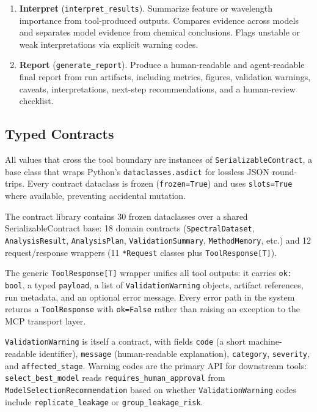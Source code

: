 \begin{enumerate}
  \item \textbf{Interpret} (\texttt{interpret\_results}).
    Summarize feature or wavelength importance from tool-produced outputs.
    Compares evidence across models and separates model evidence from chemical
    conclusions.
    Flags unstable or weak interpretations via explicit warning codes.

  \item \textbf{Report} (\texttt{generate\_report}).
    Produce a human-readable and agent-readable final report from run
    artifacts, including metrics, figures, validation warnings, caveats,
    interpretations, next-step recommendations, and a human-review checklist.
\end{enumerate}

\subsection{Typed Contracts}
\label{sec:contracts}

All values that cross the tool boundary are instances of
\texttt{SerializableContract}, a base class that wraps Python's
\texttt{dataclasses.asdict} for lossless JSON round-trips.
Every contract dataclass is frozen (\texttt{frozen=True}) and uses
\texttt{slots=True} where available, preventing accidental mutation.

The contract library contains 30 frozen dataclasses over a shared
SerializableContract base: 18 domain contracts
(\texttt{SpectralDataset}, \texttt{AnalysisResult}, \texttt{AnalysisPlan},
\texttt{ValidationSummary}, \texttt{MethodMemory}, etc.) and 12
request/response wrappers (11 \texttt{*Request} classes plus
\texttt{ToolResponse[T]}).

The generic \texttt{ToolResponse[T]} wrapper unifies all tool outputs:
it carries \texttt{ok: bool}, a typed \texttt{payload}, a list of
\texttt{ValidationWarning} objects, artifact references, run metadata, and an
optional error message.
Every error path in the system returns a \texttt{ToolResponse} with
\texttt{ok=False} rather than raising an exception to the MCP transport layer.

\texttt{ValidationWarning} is itself a contract, with fields \texttt{code}
(a short machine-readable identifier), \texttt{message} (human-readable
explanation), \texttt{category}, \texttt{severity}, and
\texttt{affected\_stage}.
Warning codes are the primary API for downstream tools: \texttt{select\_best\_model}
reads \texttt{requires\_human\_approval} from \texttt{ModelSelectionRecommendation}
based on whether \texttt{ValidationWarning} codes include
\texttt{replicate\_leakage} or \texttt{group\_leakage\_risk}.


